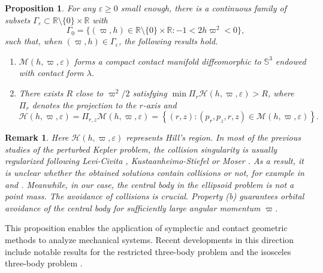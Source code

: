 \documentclass[11pt]{amsart}
\newcommand{\rr}{\mathbb R}
\newcommand{\ep}{\varepsilon}
\newcommand{\om}{\varpi}
\newtheorem{prop}{Proposition}[section]
\newtheorem{remark}{Remark}[section]
\begin{document}
\begin{prop}\label{prop;diffeomorphic to S3}
For any $\ep\ge 0$ small enough, there is a continuous family of subsets $\Gamma_{\ep} \subset \rr \setminus \{0\} \times \rr$ with 
$$ \Gamma_0 = \{ (\om,h) \in \rr \setminus \{0\} \times \rr:-1<2h\om^2<0 \},$$
such that, when $(\om,h)\in\Gamma_\ep$, the following results hold. 
	\begin{enumerate}
		\item[(a)] $\mathcal{M}(h,\om,\ep)$ forms a compact contact manifold diffeomorphic to $\mathbb{S}^{3}$ endowed with contact form $\lambda$.
		\item[(b)] There exists $R$ close to $\om^2/2$ satisfying $\min\Pi_{r}\mathcal{H}(h,\om,\ep)>R$, where $\Pi_{r}$ denotes the projection to the $r$-axis and
		\begin{equation*}
			\mathcal{H}(h, \om, \ep) = \Pi_{r, z} \mathcal{M}(h, \om, \ep) = \left\{ (r, z): (p_r, p_z, r, z) \in \mathcal{M}(h, \om, \ep)\right\}.
		\end{equation*}		
	\end{enumerate}
\end{prop}

\begin{remark}
	Here $\mathcal{H}(h, \om, \ep)$ represents Hill's region. In most of the previous studies of the perturbed Kepler problem, the collision singularity is usually regularized following Levi-Civita \cite{LC20}, Kustaanheimo-Stiefel \cite{KS65} or Moser \cite{Moser70}. As a result, it is unclear whether the obtained solutions contain collisions or not, for example in \cite{BOZ19} and \cite{Zhao23}. Meanwhile, in our case, the central body in the ellipsoid problem is not a point mass. The avoidance of collisions is crucial. Property (b) guarantees orbital avoidance of the central body for sufficiently large angular momentum $\om$.
\end{remark}

This proposition enables the application of symplectic and contact geometric methods to analyze mechanical systems. Recent developments in this direction include notable results for the restricted three-body problem \cite{AFvKP12,AFFHvK12,MvK22} and the isosceles three-body problem \cite{Hu2023ASD}. 
\end{document}
